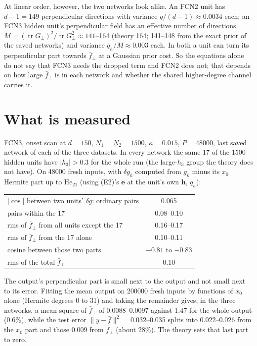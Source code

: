 \documentclass[11pt,a4paper]{article}
\begin{document}
At linear order, however, the two networks look alike. An FCN2 unit has $d-1=149$ perpendicular directions with
variance $q/(d-1)\approx0.0034$ each; an FCN3 hidden unit's perpendicular field has an effective number of directions
$M=(\operatorname{tr}G_\perp)^2/\operatorname{tr}G_\perp^2\approx141$--164 (theory 164; 141--148 from the exact prior of the
saved networks) and variance $\bar q_h/M\approx0.003$ each. In both a unit can turn its perpendicular part towards
$\bar f_\perp$ at a Gaussian prior cost. So the equations alone do not say that FCN3 needs the dropped term and FCN2
does not; that depends on how large $\bar f_\perp$ is in each network and whether the shared higher-degree channel
carries it.

\section*{What is measured}

FCN3, onset scan at $d=150$, $N_1=N_2=1500$, $\kappa=0.015$, $P=48000$, last saved network of each of the three
datasets. In every network the same 17 of the 1500 hidden units have $|h_3|>0.3$ for the whole run (the large-$h_3$
group the theory does not have). On 48000 fresh inputs, with $\delta g_k$ computed from $g_k$ minus its
$x_0$ Hermite part up to $\mathrm{He}_{21}$ (using (E2)'s $\mathbf e$ at the unit's own $\mathbf h$, $q_h$):
\begin{center}
\begin{tabular}{@{}lc@{}}
\toprule
$|\cos|$ between two units' $\delta g$: ordinary pairs & 0.065\\
\phantom{$|\cos|$ between two units' $\delta g$:} pairs within the 17 & 0.08--0.10\\
rms of $\bar f_\perp$ from all units except the 17 & 0.16--0.17\\
rms of $\bar f_\perp$ from the 17 alone & 0.10--0.11\\
cosine between those two parts & $-0.81$ to $-0.83$\\
rms of the total $\bar f_\perp$ & 0.10\\
\bottomrule
\end{tabular}
\end{center}
The output's perpendicular part is small next to the output and not small next to its error. Fitting the mean output on
200000 fresh inputs by functions of $x_0$ alone (Hermite degrees 0 to 31) and taking the remainder gives, in the three
networks, a mean square of $\bar f_\perp$ of 0.0088--0.0097 against 1.47 for the whole output (0.6\%), while the test
error $\|y-\bar f\|^2=0.032$--0.035 splits into 0.022--0.026 from the $x_0$ part and those 0.009 from $\bar f_\perp$
(about 28\%). The theory sets that last part to zero.
\end{document}
